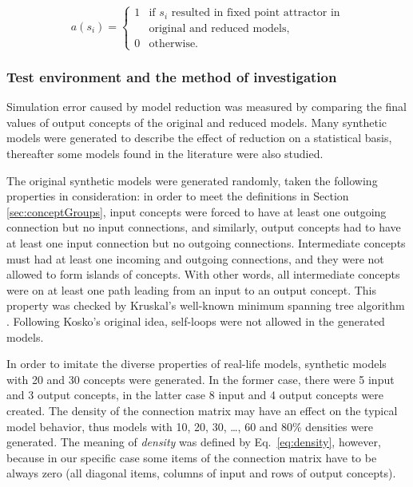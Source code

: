 \documentclass[graybox]{svmult}
\begin{document}
\begin{equation}
  \label{eq:isUsable}
  a(s_i) = \left\{ \begin{array}{ll}
                     1 & \textrm{if } s_i \textrm{ resulted in fixed point attractor in} \\
                       & \textrm{original and reduced models,} \\
                     0 & \textrm{otherwise.}
                   \end{array} \right.
\end{equation}

\subsubsection{Test environment and the method of investigation}
\label{sec:testEnvironment}

Simulation error caused by model reduction was measured by comparing 
the final values of output concepts of the original and reduced models. 
Many synthetic models were generated to describe the effect of 
reduction on a statistical basis, thereafter some models found in the 
literature were also studied.

The original synthetic models were generated randomly, taken the 
following properties in consideration: in order to meet the definitions 
in Section \ref{sec:conceptGroups}, input concepts were forced to have 
at least one outgoing connection but no input connections, and 
similarly, output concepts had to have at least one input connection 
but no outgoing connections. Intermediate concepts must had at least 
one incoming and outgoing connections, and they were not allowed to 
form islands of concepts. With other words, all intermediate concepts 
were on at least one path leading from an input to an output concept. 
This property was checked by Kruskal's well-known minimum spanning tree 
algorithm \cite{kruskal1956shortest}. Following Kosko's original idea, 
self-loops were not allowed in the generated models.

In order to imitate the diverse properties of real-life models, 
synthetic models with 20 and 30 concepts were generated. In the former 
case, there were 5 input and 3 output concepts, in the latter case 8 
input and 4 output concepts were created. The density of the connection 
matrix may have an effect on the typical model behavior, thus models 
with 10, 20, 30, \dots, 60 and 80\% densities were generated. The 
meaning of \emph{density} was defined by Eq.~\ref{eq:density}, however, 
because in our specific case some items of the connection matrix have 
to be always zero (all diagonal items, columns of input and rows of 
output concepts).
\end{document}
